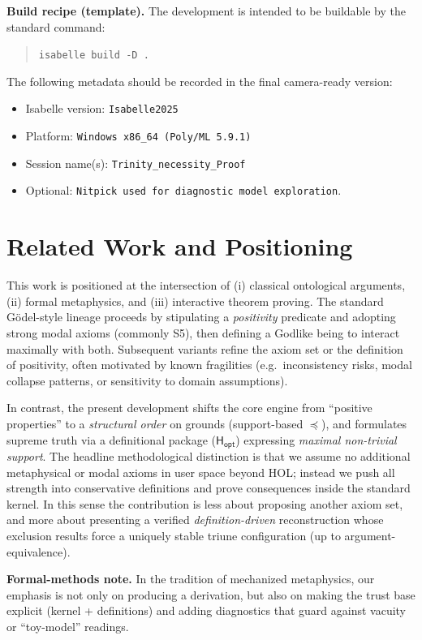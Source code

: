 \documentclass[a4paper, 11pt]{article}
\theoremstyle{plain}
\theoremstyle{definition}
\newcommand{\Hopt}{\mathsf{H_{opt}}}       %
\begin{document}
\noindent\textbf{Build recipe (template).} The development is intended to be buildable by the standard command:
\begin{quote}
\texttt{isabelle build -D .}
\end{quote}
\noindent The following metadata should be recorded in the final camera-ready version:
\begin{itemize}
  \item Isabelle version: \texttt{Isabelle2025}
  \item Platform: \texttt{Windows x86\_64 (Poly/ML 5.9.1)}
  \item Session name(s): \texttt{Trinity\_necessity\_Proof}
  \item Optional: \texttt{Nitpick used for diagnostic model exploration}.
\end{itemize}

\section{Related Work and Positioning}
\label{sec:related}
This work is positioned at the intersection of (i) classical ontological arguments, (ii) formal metaphysics, and (iii) interactive theorem proving. The standard G\"odel-style lineage proceeds by stipulating a \emph{positivity} predicate and adopting strong modal axioms (commonly S5), then defining a Godlike being to interact maximally with both. Subsequent variants refine the axiom set or the definition of positivity, often motivated by known fragilities (e.g.\ inconsistency risks, modal collapse patterns, or sensitivity to domain assumptions).

In contrast, the present development shifts the core engine from ``positive properties'' to a \emph{structural order} on grounds (support-based $\preceq$), and formulates supreme truth via a definitional package ($\Hopt$) expressing \emph{maximal non-trivial support}. The headline methodological distinction is that we assume no additional metaphysical or modal axioms in user space beyond HOL; instead we push all strength into conservative definitions and prove consequences inside the standard kernel. In this sense the contribution is less about proposing another axiom set, and more about presenting a verified \emph{definition-driven} reconstruction whose exclusion results force a uniquely stable triune configuration (up to argument-equivalence).

\noindent\textbf{Formal-methods note.} In the tradition of mechanized metaphysics, our emphasis is not only on producing a derivation, but also on making the trust base explicit (kernel + definitions) and adding diagnostics that guard against vacuity or ``toy-model'' readings.
\end{document}
